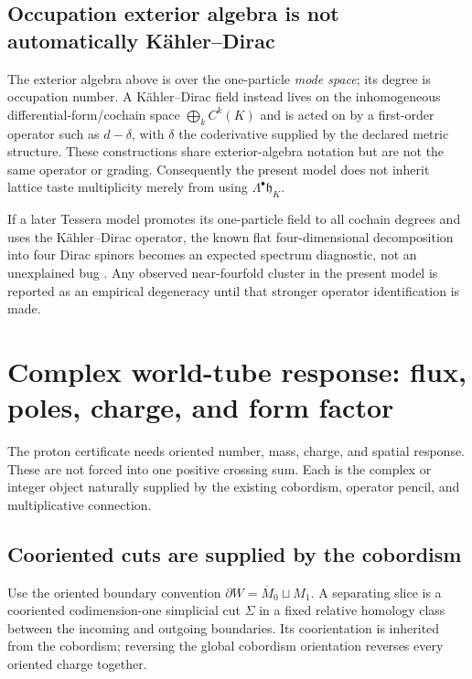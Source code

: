 \documentclass[11pt,letterpaper]{article}
\newcommand{\hh}{\mathfrak{h}}
\begin{document}
\subsection{Occupation exterior algebra is not automatically K\"ahler--Dirac}

The exterior algebra above is over the one-particle \emph{mode space}; its
degree is occupation number. A K\"ahler--Dirac field instead lives on the
inhomogeneous differential-form/cochain space $\bigoplus_{k}C^{k}(K)$ and is
acted on by a first-order operator such as $d-\delta$, with $\delta$ the
coderivative supplied by the declared metric structure. These constructions
share exterior-algebra notation but are not the same operator or grading.
Consequently the present model does not inherit lattice taste multiplicity
merely from using $\Lambda^{\bullet}\hh_{K}$.

If a later Tessera model promotes its one-particle field to all cochain degrees
and uses the K\"ahler--Dirac operator, the known flat four-dimensional
decomposition into four Dirac spinors becomes an expected spectrum diagnostic,
not an unexplained bug \cite{becherjoos1982,buttcatterall2021}. Any observed
near-fourfold cluster in the present model is reported as an empirical
degeneracy until that stronger operator identification is made.

\section{Complex world-tube response: flux, poles, charge, and form
factor}\label{sec:readout}

The proton certificate needs oriented number, mass, charge, and spatial
response. These are not forced into one positive crossing sum. Each is the
complex or integer object naturally supplied by the existing cobordism,
operator pencil, and multiplicative connection.

\subsection{Cooriented cuts are supplied by the cobordism}

Use the oriented boundary convention
$\partial W=\overline M_0\sqcup M_1$. A separating slice is a cooriented
codimension-one simplicial cut $\Sigma$ in a fixed relative homology class
between the incoming and outgoing boundaries. Its coorientation is inherited
from the cobordism; reversing the global cobordism orientation reverses every
oriented charge together.
\end{document}
